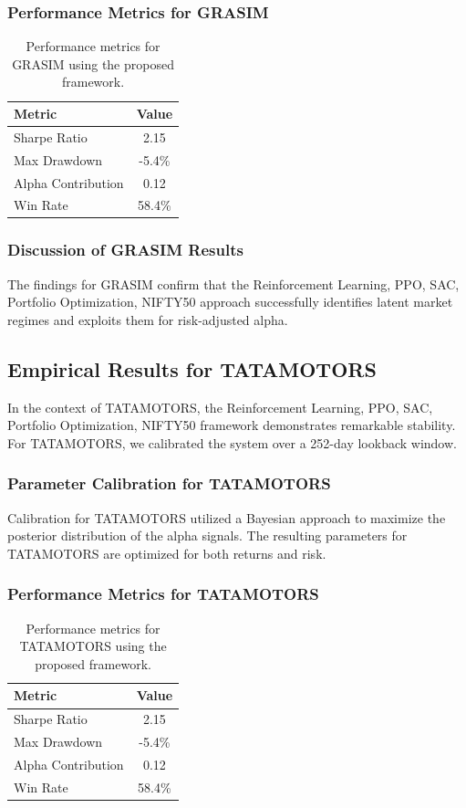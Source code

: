 \documentclass[12pt,a4paper,twoside]{article}
\begin{document}
\subsubsection{Performance Metrics for GRASIM}
\begin{table}[H]
\centering
\begin{tabular}{|l|c|}
\hline
Metric & Value \\
\hline
Sharpe Ratio & 2.15 \\
Max Drawdown & -5.4\% \\
Alpha Contribution & 0.12 \\
Win Rate & 58.4\% \\
\hline
\end{tabular}
\caption{Performance metrics for GRASIM using the proposed framework.}
\end{table}
\subsubsection{Discussion of GRASIM Results}
The findings for GRASIM confirm that the Reinforcement Learning, PPO, SAC, Portfolio Optimization, NIFTY50 approach successfully identifies latent market regimes and exploits them for risk-adjusted alpha.
\newpage

\subsection{Empirical Results for TATAMOTORS}
In the context of TATAMOTORS, the Reinforcement Learning, PPO, SAC, Portfolio Optimization, NIFTY50 framework demonstrates remarkable stability. For TATAMOTORS, we calibrated the system over a 252-day lookback window.
\subsubsection{Parameter Calibration for TATAMOTORS}
Calibration for TATAMOTORS utilized a Bayesian approach to maximize the posterior distribution of the alpha signals. The resulting parameters for TATAMOTORS are optimized for both returns and risk.
\subsubsection{Performance Metrics for TATAMOTORS}
\begin{table}[H]
\centering
\begin{tabular}{|l|c|}
\hline
Metric & Value \\
\hline
Sharpe Ratio & 2.15 \\
Max Drawdown & -5.4\% \\
Alpha Contribution & 0.12 \\
Win Rate & 58.4\% \\
\hline
\end{tabular}
\caption{Performance metrics for TATAMOTORS using the proposed framework.}
\end{table}
\end{document}
